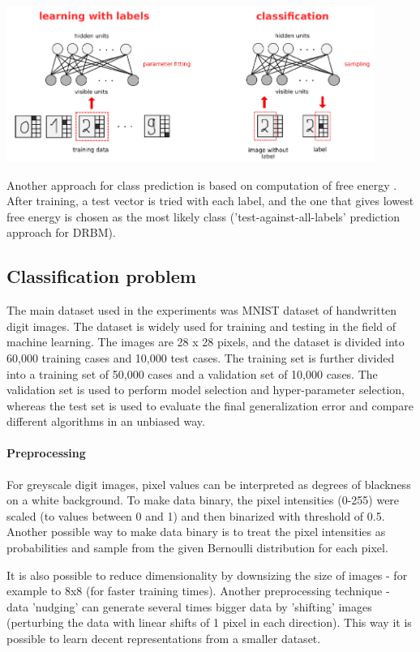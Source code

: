 \documentclass[a4paper]{scrartcl}
\begin{document}
\begin{center}
\includegraphics[width=12cm]{images/DRBM.png}
\end{center}
Another approach for class prediction is based on computation of free energy \cite{Hinton}. After training, a test vector is tried with each label, and the one that gives lowest free energy is chosen as the most likely class ('test-against-all-labels' prediction approach for DRBM).

\subsection{Classification problem}
\par The main dataset used in the experiments was MNIST dataset of handwritten digit images. The dataset is widely used for training and testing in the field of machine learning. The images are 28 x 28 pixels, and the dataset is divided into 60,000 training cases and 10,000 test cases. The training set is further divided into a training set of 50,000 cases and a validation set of 10,000 cases. The validation set is used to perform model selection and hyper-parameter selection, whereas the test set is used to evaluate the final generalization error and compare different algorithms in an unbiased way.
\paragraph{Preprocessing} For greyscale digit images, pixel values can be interpreted as degrees of blackness on a white background. To make data binary, the pixel intensities (0-255) were scaled (to values between 0 and 1) and then binarized with threshold of 0.5. Another possible way to make data binary is to treat the pixel intensities as probabilities and sample from the given Bernoulli distribution for each pixel. 
\par It is also possible to reduce dimensionality by downsizing the size of images - for example to 8x8 (for faster training times). Another preprocessing technique - data 'nudging' can generate several times bigger data by 'shifting' images (perturbing the data with linear shifts of 1 pixel in each direction). This way it is possible to learn decent representations from a smaller dataset.
 
\end{document}
